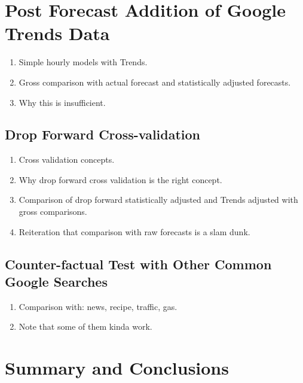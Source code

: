 \documentclass{article}
\begin{document}
\section{Post Forecast Addition of Google Trends Data}

  \begin{enumerate}
    \item Simple hourly models with Trends.
    \item Gross comparison with actual forecast and statistically adjusted forecasts.
    \item Why this is insufficient.
  \end{enumerate}

  \subsection{Drop Forward Cross-validation}
  
    \begin{enumerate}
      \item Cross validation concepts.
      \item Why drop forward cross validation is the right concept.
      \item Comparison of drop forward statistically adjusted and Trends adjusted with gross comparisons.
      \item Reiteration that comparison with raw forecasts is a slam dunk.
    \end{enumerate}
    
  \subsection{Counter-factual Test with Other Common Google Searches}
    \begin{enumerate}
      \item Comparison with: news, recipe, traffic, gas.
      \item Note that some of them kinda work.
    \end{enumerate}

\section{Summary and Conclusions}

% 
% 
\end{document}
